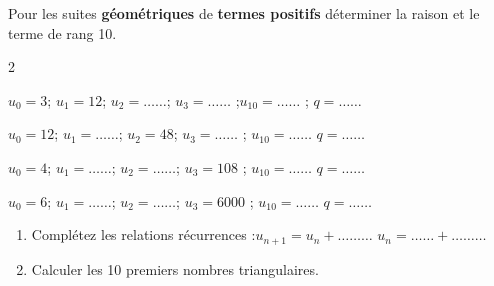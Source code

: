 \documentclass[main.tex]{subfiles}
\begin{document}
\begin{exercise} \label{chapter05:exercise:suites04} 
	Pour les suites \textbf{géométriques}   de \textbf{termes positifs}  déterminer la raison et  le terme de rang 10. 
	\vspace{-1em}
	\begin{spacing}{2}
		\begin{description} 
			\item  $u_0=3$; $u_1=12$; $u_2=\ldots\ldots$; $u_3=\ldots\ldots$ ;\hfill $u_{10}=\ldots\ldots$  ;  \hfill  {$q=\ldots\ldots  $}  
			\item  $u_0=12$; $u_1=\ldots\ldots$; $u_2=48$; $u_3=\ldots\ldots$ ; \hfill$u_{10}=\ldots\ldots$    \hfill  {$q=\ldots\ldots  $}  
			\item  $u_0=4$; $u_1=\ldots\ldots$; $u_2=\ldots\ldots$; $u_3=108$ ; \hfill$u_{10}=\ldots\ldots$    \hfill  {$q=\ldots\ldots  $}   
			\item  $u_0=6$; $u_1=\ldots\ldots$; $u_2=\ldots\ldots$; $u_3=6000$ ; \hfill$u_{10}=\ldots\ldots$     \hfill  {$q=\ldots\ldots  $}  
		\end{description} 
	\end{spacing}\vspace{-1em}
\end{exercise}
\begin{exercise}\label{chapter05:exercise:suites05}\hfill 
	
\newlength\radius
\pgfmathsetlength{\radius}{0.2cm}
\newcommand\drawballs[2][]{%
	\foreach \y [evaluate=\y as \yy using #2+1-\y] in {1,...,#2} {%
		\foreach \x in {1,...,\yy} {%
			\shade[shading=ball,ball color=white,#1] 
			({(2*\x-2+\y)*\radius},{sqrt(3)*\y*\radius}) circle (\radius); 
		};
	}%
}  	
\noindent\hfill 
{}
\hfill \null
\begin{enumerate}[label=\arabic*),leftmargin=*]
	\item Complétez les relations récurrences :\hfill $u_{n+1}=u_n+\ldots\ldots\ldots$ \hfill $u_{n}=\ldots\ldots+\ldots\ldots\ldots$
	\item Calculer les 10 premiers nombres triangulaires.
\end{enumerate}	
\end{exercise}
\end{document}
